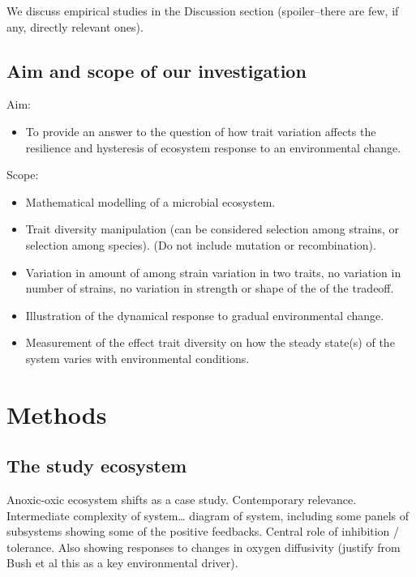 \documentclass{article}
\begin{document}
We discuss empirical studies in the Discussion section (spoiler--there
are few, if any, directly relevant ones).

\hypertarget{aim-and-scope-of-our-investigation}{%
\subsection{Aim and scope of our
investigation}\label{aim-and-scope-of-our-investigation}}

Aim:

\begin{itemize}
\tightlist
\item
  To provide an answer to the question of how trait variation affects
  the resilience and hysteresis of ecosystem response to an
  environmental change.
\end{itemize}

Scope:

\begin{itemize}
\item
  Mathematical modelling of a microbial ecosystem.
\item
  Trait diversity manipulation (can be considered selection among
  strains, or selection among species). (Do not include mutation or
  recombination).
\item
  Variation in amount of among strain variation in two traits, no
  variation in number of strains, no variation in strength or shape of
  the of the tradeoff.
\item
  Illustration of the dynamical response to gradual environmental
  change.
\item
  Measurement of the effect trait diversity on how the steady state(s)
  of the system varies with environmental conditions.
\end{itemize}

\hypertarget{methods}{%
\section{Methods}\label{methods}}

\hypertarget{the-study-ecosystem}{%
\subsection{The study ecosystem}\label{the-study-ecosystem}}

Anoxic-oxic ecosystem shifts as a case study. Contemporary relevance.
Intermediate complexity of system\ldots{} diagram of system, including
some panels of subsystems showing some of the positive feedbacks.
Central role of inhibition / tolerance. Also showing responses to
changes in oxygen diffusivity (justify from Bush et al this as a key
environmental driver).
\end{document}
